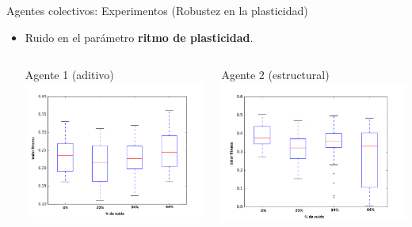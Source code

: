 \documentclass[aspectratio=169]{beamer}
\begin{document}
\begin{frame}{Agentes colectivos: Experimentos (Robustez en la plasticidad)}
  \begin{itemize}
    \item Ruido en el parámetro \textbf{ritmo de plasticidad}.
    \begin{columns}
      \begin{column}{0.47\textwidth}
        \begin{block}{Agente 1 (aditivo)}
        \includegraphics[width=1.0\textwidth,height=.6\textheight]{Imagenes/BoxPlotNP1}
      \end{block}
      \end{column}
      \begin{column}{0.5\textwidth}
        \begin{block}{Agente 2 (estructural)}
        \includegraphics[width=1.0\textwidth,height=.6\textheight]{Imagenes/BoxPlotNP2}
        \end{block}
      \end{column}
    \end{columns}
  \end{itemize}
\end{frame}
\end{document}
